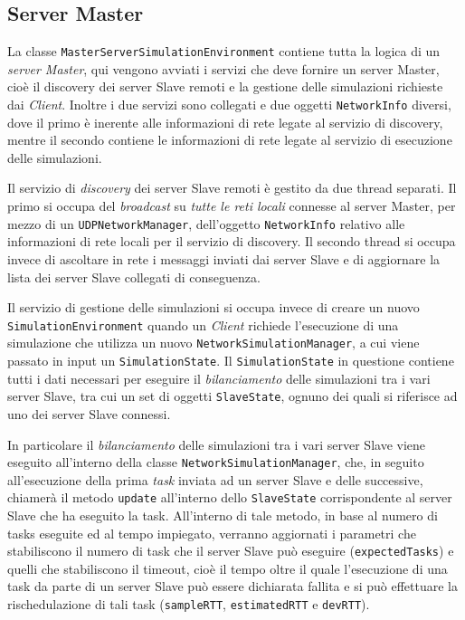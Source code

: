 \subsection{Server Master}

La classe \texttt{MasterServerSimulationEnvironment} contiene tutta la logica di un \emph{server Master}, qui vengono avviati i servizi che deve fornire un server Master, cioè il discovery dei server Slave remoti e la gestione delle simulazioni richieste dai \emph{Client}. Inoltre i due servizi sono collegati e due oggetti \texttt{NetworkInfo} diversi, dove il primo è inerente alle informazioni di rete legate al servizio di discovery, mentre il secondo contiene le informazioni di rete legate al servizio di esecuzione delle simulazioni.

Il servizio di \emph{discovery} dei server Slave remoti è gestito da due thread separati. Il primo si occupa del \emph{broadcast} su \emph{tutte le reti locali} connesse al server Master, per mezzo di un \texttt{UDPNetworkManager}, dell'oggetto \texttt{NetworkInfo} relativo alle informazioni di rete locali per il servizio di discovery. Il secondo thread si occupa invece di ascoltare in rete i messaggi inviati dai server Slave e di aggiornare la lista dei server Slave collegati di conseguenza.

Il servizio di gestione delle simulazioni si occupa invece di creare un nuovo \texttt{SimulationEnvironment} quando un \emph{Client} richiede l'esecuzione di una simulazione che utilizza un nuovo \texttt{NetworkSimulationManager}, a cui viene passato in input un \texttt{SimulationState}. Il \texttt{SimulationState} in questione contiene tutti i dati necessari per eseguire il \emph{bilanciamento} delle simulazioni tra i vari server Slave, tra cui un set di oggetti \texttt{SlaveState}, ognuno dei quali si riferisce ad uno dei server Slave connessi.

In particolare il \emph{bilanciamento} delle simulazioni tra i vari server Slave viene eseguito all'interno della classe \texttt{NetworkSimulationManager}, che, in seguito all'esecuzione della prima \emph{task} inviata ad un server Slave e delle successive, chiamerà il metodo \texttt{update} all'interno dello \texttt{SlaveState} corrispondente al server Slave che ha eseguito la task. All'interno di tale metodo, in base al numero di tasks eseguite ed al tempo impiegato, verranno aggiornati i parametri che stabiliscono il numero di task che il server Slave può eseguire (\texttt{expectedTasks}) e quelli che stabiliscono il timeout, cioè il tempo oltre il quale l'esecuzione di una task da parte di un server Slave può essere dichiarata fallita e si può effettuare la rischedulazione di tali task (\texttt{sampleRTT}, \texttt{estimatedRTT} e \texttt{devRTT}).

